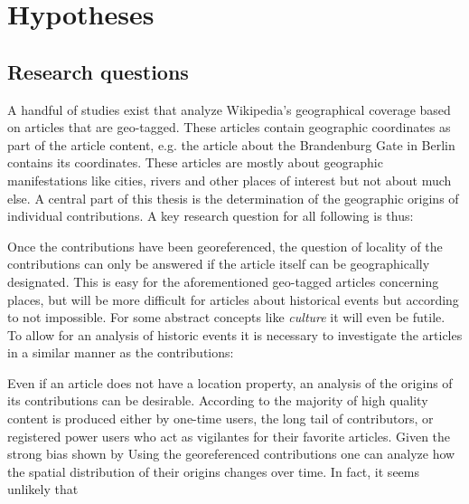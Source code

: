 \chapter{Hypotheses}\label{ch:hypotheses}

\section{Research questions}

A handful of studies exist that analyze Wikipedia's geographical coverage based on articles that are geo-tagged.
These articles contain geographic coordinates as part of the article content, e.g. the article about the Brandenburg Gate in Berlin contains its coordinates.
These articles are mostly about geographic manifestations like cities, rivers and other places of interest but not about much else. 
A central part of this thesis is the determination of the geographic origins of individual contributions.
A key research question for all following is thus:


Once the contributions have been georeferenced, the question of locality of the contributions can only be answered if the article itself can be geographically designated. 
This is easy for the aforementioned geo-tagged articles concerning places, but will be more difficult for articles about historical events but according to \textcite{buscaldi2007comparison} not impossible.
For some abstract concepts like \emph{culture} it will even be futile.
To allow for an analysis of historic events it is necessary to investigate the articles in a similar manner as the contributions:


Even if an article does not have a location property, an analysis of the origins of its contributions can be desirable.
According to \textcite{anthony2005explaining} the majority of high quality content is produced either by one-time users, the long tail of contributors, or registered power users who act as vigilantes for their favorite articles. 
Given the strong bias shown by \textcite{ortega2009wikipedia} 
Using the georeferenced contributions one can analyze how the spatial distribution of their origins changes over time.
In fact, it seems unlikely that 

